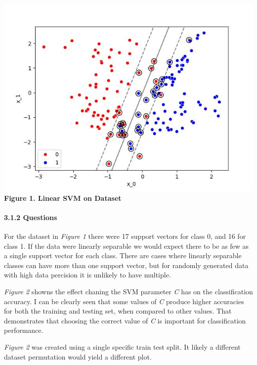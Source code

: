 \documentclass[11pt]{article}
\begin{document}
\includegraphics{figures/3_1_dataset_SVM.jpg}\\
\textbf{Figure 1. Linear SVM on Dataset}

    \hypertarget{questions}{%
\paragraph{3.1.2 Questions}\label{questions}}

For the dataset in \emph{Figure 1} there were 17 support vectors for
class 0, and 16 for class 1. If the data were linearly separable we
would expect there to be as few as a single support vector for each
class. There are cases where linearly separable classes can have more
than one support vector, but for randomly generated data with high data
percision it is unlikely to have multiple.

\emph{Figure 2} showns the effect chaning the SVM parameter \emph{C} has
on the classification accuracy. I can be clearly seen that some values
of \emph{C} produce higher accuracies for both the training and testing
set, when compared to other values. That demonstrates that choosing the
correct value of \emph{C} is important for classification performance.

\emph{Figure 2} was created using a single specific train test split. It
likely a different dataset permutation would yield a different plot.
\end{document}
